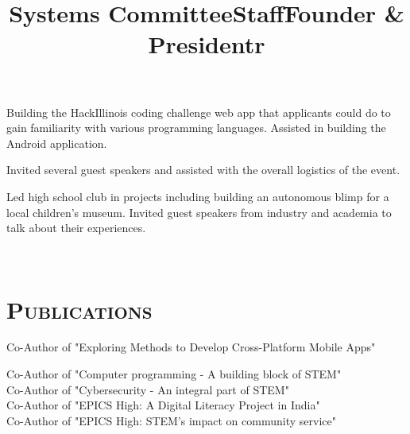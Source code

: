 \begin{resume}
\title{Systems Committee}
\begin{position}
Building the HackIllinois coding challenge web app that applicants could do to gain familiarity with various programming languages. Assisted in building the Android application.
\end{position}

\title{Staff}
\begin{position}
Invited several guest speakers and assisted with the overall logistics of the event.
\end{position}

\title{Founder \& President}
\begin{position}
Led high school club in projects including building an autonomous blimp for a local children's museum. Invited guest speakers from industry and academia to talk about their experiences.
\end{position}

\begin{formatb}
  \title{r}\\
\end{formatb}

\section{\textsc{Publications}}

\title{}
\begin{position}
Co-Author of "Exploring Methods to Develop Cross-Platform Mobile Apps"
\end{position}

\title{}
\begin{position}
Co-Author of "Computer programming - A building block of STEM" \\
Co-Author of "Cybersecurity - An integral part of STEM" \\
Co-Author of "EPICS High: A Digital Literacy Project in India" \\
Co-Author of "EPICS High: STEM's impact on community service"
\end{position}

\end{resume}

